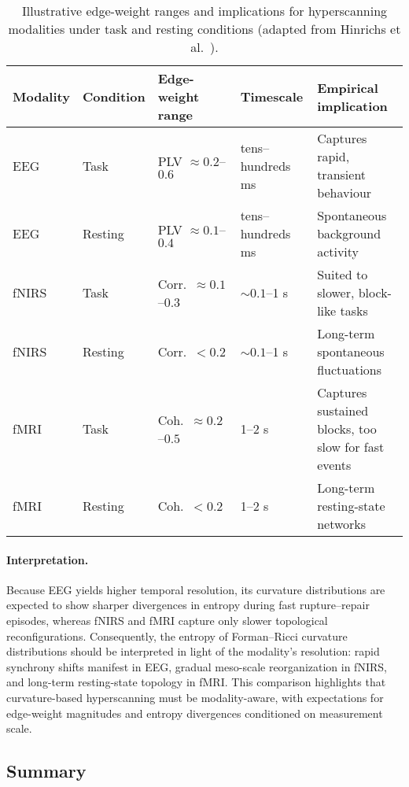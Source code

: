 \documentclass{article}
\theoremstyle{definition}
\begin{document}
\begin{table}[H]
\centering
\caption{Illustrative edge-weight ranges and implications for hyperscanning modalities under task and resting conditions (adapted from Hinrichs et al.~\cite{hinrichs2025geometry}).}
\label{tab:modality-comparison}
\begin{tabularx}{\textwidth}{@{}p{1.5cm} p{1.8cm} p{2.5cm} p{2cm} X@{}}
\toprule
\textbf{Modality} & \textbf{Condition} & \textbf{Edge-weight range} & \textbf{Timescale} & \textbf{Empirical implication} \\
\midrule
EEG   & Task    & PLV $\approx 0.2$--$0.6$ & tens--hundreds ms & Captures rapid, transient behaviour \\
EEG   & Resting & PLV $\approx 0.1$--$0.4$ & tens--hundreds ms & Spontaneous background activity \\
\addlinespace
fNIRS & Task    & Corr.\ $\approx 0.1$--$0.3$ & $\sim 0.1$--1 s & Suited to slower, block-like tasks \\
fNIRS & Resting & Corr.\ $< 0.2$ & $\sim 0.1$--1 s & Long-term spontaneous fluctuations \\
\addlinespace
fMRI  & Task    & Coh.\ $\approx 0.2$--$0.5$ & 1--2 s & Captures sustained blocks, too slow for fast events \\
fMRI  & Resting & Coh.\ $< 0.2$ & 1--2 s & Long-term resting-state networks \\
\bottomrule
\end{tabularx}
\end{table}

\paragraph{Interpretation.}
Because EEG yields higher temporal resolution, its curvature distributions are
expected to show sharper divergences in entropy during fast rupture--repair
episodes, whereas fNIRS and fMRI capture only slower topological reconfigurations.
Consequently, the entropy of Forman--Ricci curvature distributions should be
interpreted in light of the modality’s resolution: rapid synchrony shifts
manifest in EEG, gradual meso-scale reorganization in fNIRS, and long-term
resting-state topology in fMRI. This comparison highlights that curvature-based
hyperscanning must be modality-aware, with expectations for edge-weight
magnitudes and entropy divergences conditioned on measurement scale.

\subsection{Summary}
\end{document}
